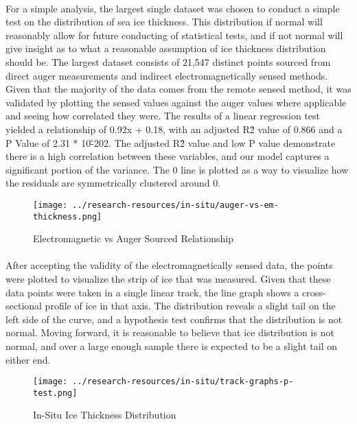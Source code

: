 \paragraph*{}
For a simple analysis, the largest single dataset was chosen to conduct a simple test on the distribution of sea ice thickness. This distribution if normal will reasonably allow for future conducting of statistical tests, and if not normal will give insight as to what a reasonable assumption of ice thickness distribution should be. The largest dataset consists of 21,547 distinct points sourced from direct auger measurements and indirect electromagnetically sensed methods. Given that the majority of the data comes from the remote sensed method, it was validated by plotting the sensed values against the auger values where applicable and seeing how correlated they were. The results of a linear regression test yielded a relationship of 0.92x + 0.18, with an adjusted R\^2 value of 0.866 and a P Value of 2.31 * 10\^-202. The adjusted R\^2 value and low P value demonstrate there is a high correlation between these variables, and our model captures a significant portion of the variance. The 0 line is plotted as a way to visualize how the residuals are symmetrically clustered around 0.
\par

\begin{figure}[htb]
	\centering
	\texttt{[image: ../research-resources/in-situ/auger-vs-em-thickness.png]}
	\caption{Electromagnetic vs Auger Sourced Relationship}
	\label{fig:aug-vs-em}
\end{figure}

\paragraph*{}
After accepting the validity of the electromagnetically sensed data, the points were plotted to visualize the strip of ice that was measured. Given that these data points were taken in a single linear track, the line graph shows a cross-sectional profile of ice in that axis. The distribution reveals a slight tail on the left side of the curve, and a hypothesis test confirms that the distribution is not normal. Moving forward, it is reasonable to believe that ice distribution is not normal, and over a large enough sample there is expected to be a slight tail on either end.
\par
\begin{figure}[htb]
	\centering
	\texttt{[image: ../research-resources/in-situ/track-graphs-p-test.png]}
	\caption{In-Situ Ice Thickness Distribution}
	\label{fig:p-test-aug}
\end{figure}


